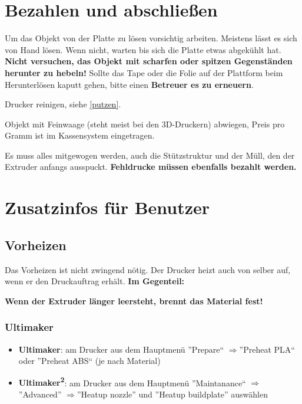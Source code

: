 \documentclass{\basedir/fablab-document}
\newcommand{\ts}[1]{\textsuperscript{#1}}
\newcommand{\ra}{$\Rightarrow$}
\begin{document}
\section{Bezahlen und abschließen}

Um das Objekt von der Platte zu lösen vorsichtig arbeiten. Meistens lässt es sich von Hand lösen. Wenn nicht,
warten bis sich die Platte etwas abgekühlt hat. \textbf{Nicht versuchen, das Objekt mit scharfen oder spitzen Gegenständen herunter zu hebeln!}
Sollte das Tape oder die Folie auf der Plattform beim Herunterlösen kaputt gehen, bitte einen \textbf{Betreuer es zu erneuern}.

Drucker reinigen, siehe \ref{putzen}.

Objekt mit Feinwaage (steht meist bei den 3D-Druckern) abwiegen, Preis pro Gramm ist im Kassensystem eingetragen.

Es muss alles mitgewogen werden, auch die Stützstruktur und der Müll, den der Extruder anfangs ausspuckt. \textbf{Fehldrucke müssen ebenfalls bezahlt werden.}
\pagebreak


\section{Zusatzinfos für Benutzer}

\subsection{Vorheizen} \label{vorheizen}
Das Vorheizen ist nicht zwingend nötig. Der Drucker heizt auch von selber auf, wenn er den Druckauftrag erhält. \textbf{Im Gegenteil:}

\begin{center}\textbf{Wenn der Extruder länger leersteht, brennt das Material fest!}\end{center}

\subsubsection{Ultimaker}
\begin{itemize}
    \item \textbf{Ultimaker}: am Drucker aus dem Hauptmenü ''Prepare`` \ra ''Preheat PLA`` oder ''Preheat ABS`` (je nach Material)
    \item \textbf{Ultimaker\ts2}: am Drucker aus dem Hauptmenü ''Maintanance`` \ra ''Advanced'' \ra ''Heatup nozzle'' und ''Heatup buildplate'' auswählen
\end{itemize}
\end{document}
